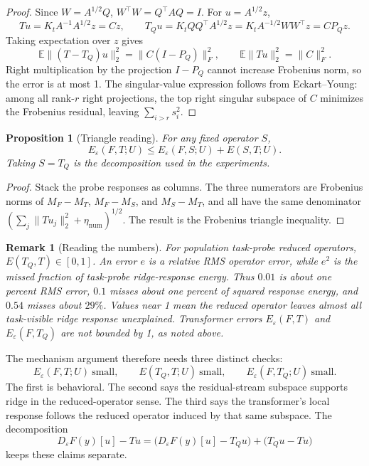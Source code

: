 \documentclass[11pt]{article}
\newtheorem{proposition}{Proposition}
\newtheorem{remark}{Remark}
\begin{document}
\begin{proof}
Since \(W=A^{1/2}Q\), \(W^\top W=Q^\top A Q=I\). For \(u=A^{1/2}z\),
\[
Tu=K_tA^{-1}A^{1/2}z=Cz,
\qquad
T_Qu=K_tQQ^\top A^{1/2}z=K_tA^{-1/2}WW^\top z=CP_Qz.
\]
Taking expectation over \(z\) gives
\[
\mathbb{E}\|(T-T_Q)u\|_2^2=\|C(I-P_Q)\|_F^2,
\qquad
\mathbb{E}\|Tu\|_2^2=\|C\|_F^2.
\]
Right multiplication by the projection \(I-P_Q\) cannot increase Frobenius norm, so the error is at
most 1. The singular-value expression follows from Eckart--Young: among all rank-\(r\) right
projections, the top right singular subspace of \(C\) minimizes the Frobenius residual, leaving
\(\sum_{i>r}s_i^2\).
\end{proof}

\begin{proposition}[Triangle reading]
For any fixed operator \(S\),
\[
E_\varepsilon(F,T;U)
\le
E_\varepsilon(F,S;U)+E(S,T;U).
\]
Taking \(S=T_Q\) is the decomposition used in the experiments.
\end{proposition}

\begin{proof}
Stack the probe responses as columns. The three numerators are Frobenius norms of
\(M_F-M_T\), \(M_F-M_S\), and \(M_S-M_T\), and all have the same denominator
\((\sum_j\|Tu_j\|_2^2+\eta_{\mathrm{num}})^{1/2}\). The result is the Frobenius triangle inequality.
\end{proof}

\begin{remark}[Reading the numbers]
For population task-probe reduced operators, \(E(T_Q,T)\in[0,1]\). An error \(e\) is a relative RMS
operator error, while \(e^2\) is the missed fraction of task-probe ridge-response energy. Thus
\(0.01\) is about one percent RMS error, \(0.1\) misses about one percent of squared response
energy, and \(0.54\) misses about \(29\%\). Values near 1 mean the reduced operator leaves almost
all task-visible ridge response unexplained. Transformer errors \(E_\varepsilon(F,T)\) and
\(E_\varepsilon(F,T_Q)\) are not bounded by 1, as noted above.
\end{remark}

The mechanism argument therefore needs three distinct checks:
\[
E_\varepsilon(F,T;U)\ \text{small},
\qquad
E(T_Q,T;U)\ \text{small},
\qquad
E_\varepsilon(F,T_Q;U)\ \text{small}.
\]
The first is behavioral. The second says the residual-stream subspace supports ridge in the
reduced-operator sense. The third says the transformer's local response follows the reduced
operator induced by that same subspace. The decomposition
\[
D_\varepsilon F(y)[u]-Tu
=
\bigl(D_\varepsilon F(y)[u]-T_Qu\bigr)
+
\bigl(T_Qu-Tu\bigr)
\]
keeps these claims separate.
\end{document}
